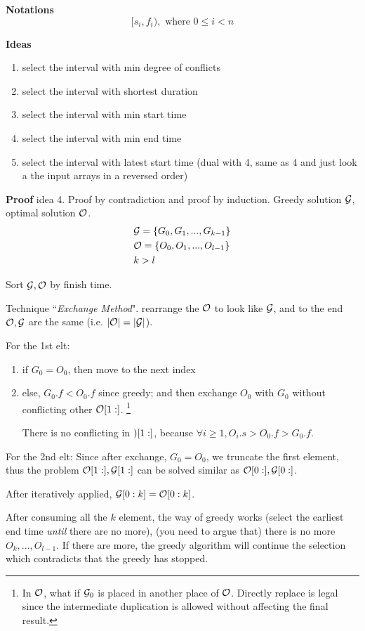 \documentclass[a4paper]{report}
\theoremstyle{definition}
\begin{document}
\textbf{Notations}
$$
[s_i, f_i), \text{ where }0 \leq i < n
$$

\textbf{Ideas}
\begin{enumerate}
\item select the interval with min degree of conflicts
\item select the interval with shortest duration
\item select the interval with min start time
\item select the interval with min end time
\item select the interval with latest start time (dual with 4, same as 4 and just look a the input arrays in a reversed order)
\end{enumerate}

\textbf{Proof} idea 4. Proof by contradiction and proof by induction. Greedy solution $\mathcal{G}$, optimal solution $\mathcal{O}$.
\begin{align*}
& \mathcal{G} = \{G_0, G_1, ..., G_{k-1}\}  \\
& \mathcal{O} = \{O_0, O_1, ..., O_{l-1}\} \\
& k > l
\end{align*}

Sort $\mathcal{G}, \mathcal{O}$  by finish time.

Technique ``\textit{Exchange Method}". rearrange the $\mathcal{O}$ to look like $\mathcal{G}$, and to the end $\mathcal{O}, \mathcal{G}$ are the same (i.e. $|\mathcal{O}|=|\mathcal{G}|$).

For the 1st elt:
\begin{enumerate}
\item if $G_0=O_0$, then move to the next index
\item else, $G_0.f < O_0.f$ since greedy; and then exchange $O_0$ with $G_0$ without conflicting other $\mathcal{O}[1:]$. \footnote{In $\mathcal{O}$, what if $\mathcal{G}_0$ is placed in another place of $\mathcal{O}$. Directly replace is legal since the intermediate duplication is allowed without affecting the final result.}
 
There is no conflicting in $\mathcal{)}[1:]$, because $\forall i\geq 1, O_i.s > O_0.f >G_0.f$.
\end{enumerate}

For the 2nd elt: Since after exchange, $G_0=O_0$, we truncate the first element, thus the problem $\mathcal{O}[1:], \mathcal{G}[1:]$ can be solved similar as  $\mathcal{O}[0:], \mathcal{G}[0:]$.

After iteratively applied, $\mathcal{G}[0:k]=\mathcal{O}[0:k]$.

After consuming all the $k$ element, the way of greedy works (select the earliest end time \textit{until} there are no more), (you need to argue that) there is no more $O_{k},..., O_{l-1}$. If there are more, the greedy algorithm will continue the selection which contradicts that the greedy has stopped.
\end{document}

